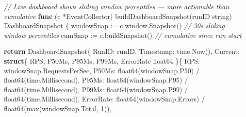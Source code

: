 \documentclass[
]{article}
\newenvironment{Shaded}{}{}
\newcommand{\CommentTok}[1]{\textcolor[rgb]{0.38,0.63,0.69}{\textit{#1}}}
\newcommand{\ControlFlowTok}[1]{\textcolor[rgb]{0.00,0.44,0.13}{\textbf{#1}}}
\newcommand{\DataTypeTok}[1]{\textcolor[rgb]{0.56,0.13,0.00}{#1}}
\newcommand{\DecValTok}[1]{\textcolor[rgb]{0.25,0.63,0.44}{#1}}
\newcommand{\KeywordTok}[1]{\textcolor[rgb]{0.00,0.44,0.13}{\textbf{#1}}}
\newcommand{\NormalTok}[1]{#1}
\newcommand{\OperatorTok}[1]{\textcolor[rgb]{0.40,0.40,0.40}{#1}}
\begin{document}
\begin{Shaded}
\begin{Highlighting}[]
\CommentTok{// Live dashboard shows sliding window percentiles — more actionable than cumulative}
\KeywordTok{func} \OperatorTok{(}\NormalTok{c }\OperatorTok{*}\NormalTok{EventCollector}\OperatorTok{)}\NormalTok{ buildDashboardSnapshot}\OperatorTok{(}\NormalTok{runID }\DataTypeTok{string}\OperatorTok{)}\NormalTok{ DashboardSnapshot }\OperatorTok{\{}
\NormalTok{    windowSnap }\OperatorTok{:=}\NormalTok{ c}\OperatorTok{.}\NormalTok{window}\OperatorTok{.}\NormalTok{Snapshot}\OperatorTok{()}   \CommentTok{// 30s sliding window percentiles}
\NormalTok{    cumSnap    }\OperatorTok{:=}\NormalTok{ c}\OperatorTok{.}\NormalTok{buildSnapshot}\OperatorTok{()}     \CommentTok{// cumulative since run start}

    \ControlFlowTok{return}\NormalTok{ DashboardSnapshot}\OperatorTok{\{}
\NormalTok{        RunID}\OperatorTok{:}\NormalTok{     runID}\OperatorTok{,}
\NormalTok{        Timestamp}\OperatorTok{:}\NormalTok{ time}\OperatorTok{.}\NormalTok{Now}\OperatorTok{(),}
\NormalTok{        Current}\OperatorTok{:} \KeywordTok{struct}\OperatorTok{\{}\NormalTok{ RPS}\OperatorTok{,}\NormalTok{ P50Ms}\OperatorTok{,}\NormalTok{ P95Ms}\OperatorTok{,}\NormalTok{ P99Ms}\OperatorTok{,}\NormalTok{ ErrorRate }\DataTypeTok{float64} \OperatorTok{\}\{}
\NormalTok{            RPS}\OperatorTok{:}\NormalTok{       windowSnap}\OperatorTok{.}\NormalTok{RequestsPerSec}\OperatorTok{,}
\NormalTok{            P50Ms}\OperatorTok{:}     \DataTypeTok{float64}\OperatorTok{(}\NormalTok{windowSnap}\OperatorTok{.}\NormalTok{P50}\OperatorTok{)} \OperatorTok{/} \DataTypeTok{float64}\OperatorTok{(}\NormalTok{time}\OperatorTok{.}\NormalTok{Millisecond}\OperatorTok{),}
\NormalTok{            P95Ms}\OperatorTok{:}     \DataTypeTok{float64}\OperatorTok{(}\NormalTok{windowSnap}\OperatorTok{.}\NormalTok{P95}\OperatorTok{)} \OperatorTok{/} \DataTypeTok{float64}\OperatorTok{(}\NormalTok{time}\OperatorTok{.}\NormalTok{Millisecond}\OperatorTok{),}
\NormalTok{            P99Ms}\OperatorTok{:}     \DataTypeTok{float64}\OperatorTok{(}\NormalTok{windowSnap}\OperatorTok{.}\NormalTok{P99}\OperatorTok{)} \OperatorTok{/} \DataTypeTok{float64}\OperatorTok{(}\NormalTok{time}\OperatorTok{.}\NormalTok{Millisecond}\OperatorTok{),}
\NormalTok{            ErrorRate}\OperatorTok{:} \DataTypeTok{float64}\OperatorTok{(}\NormalTok{windowSnap}\OperatorTok{.}\NormalTok{Errors}\OperatorTok{)} \OperatorTok{/} \DataTypeTok{float64}\OperatorTok{(}\NormalTok{max}\OperatorTok{(}\NormalTok{windowSnap}\OperatorTok{.}\NormalTok{Total}\OperatorTok{,} \DecValTok{1}\OperatorTok{)),}

\end{Highlighting}
\end{Shaded}
\end{document}
